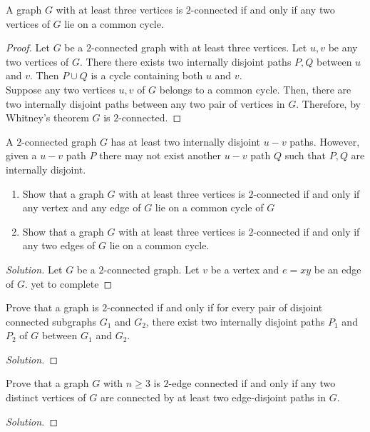 \begin{theorem}
	A graph $G$ with at least three vertices is $2$-connected if and only if any two vertices of $G$ lie on a common cycle.
\end{theorem}
\begin{proof}
	Let $G$ be a $2$-connected graph with at least three vertices. Let $u,v$ be any two vertices of $G$. There there exists two internally disjoint paths $P,Q$ between $u$ and $v$. Then $P \cup Q$ is a cycle containing both $u$ and $v$.\\

	Suppose any two vertices $u,v$ of $G$ belongs to a common cycle. Then, there are two internally disjoint paths between any two pair of vertices in $G$. Therefore, by Whitney's theorem $G$ is $2$-connected.
\end{proof}

\begin{remark}
	A $2$-connected graph $G$ has at least two internally disjoint $u-v$ paths. However, given a $u-v$ path $P$ there may not exist another $u-v$ path $Q$ such that $P,Q$ are internally disjoint.
\end{remark}

\begin{exercise}
	\begin{enumerate}
		\item Show that a graph $G$ with at least three vertices is $2$-connected if and only if any vertex and any edge of $G$ lie on a common cycle of $G$
		\item Show that a graph $G$ with at least three vertices is $2$-connected if and only if any two edges of $G$ lie on a common cycle.
	\end{enumerate}
\end{exercise}
\begin{proof}[Solution]
	Let $G$ be a $2$-connected graph. Let $v$ be a vertex and $e = xy$ be an edge of $G$.
	yet to complete
\end{proof}

\begin{exercise}
	Prove that a graph is $2$-connected if and only if for every pair of disjoint connected subgraphs $G_1$ and $G_2$, there exist two internally disjoint paths $P_1$ and $P_2$ of $G$ between $G_1$ and $G_2$.
\end{exercise}
\begin{proof}[Solution]
\end{proof}

\begin{exercise}
	Prove that a graph $G$ with $n \ge 3$ is $2$-edge connected if and only if any two distinct vertices of $G$ are connected by at least two edge-disjoint paths in $G$.	
\end{exercise}
\begin{proof}[Solution]
\end{proof}

